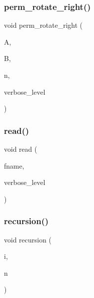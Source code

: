 \mbox{\label{costas_8_c_ab3d168af63cc369fc396300382735b31}} 
\subsubsection{\texorpdfstring{perm\+\_\+rotate\+\_\+right()}{perm\_rotate\_right()}}
{\footnotesize\ttfamily void perm\+\_\+rotate\+\_\+right (\begin{DoxyParamCaption}\item[{\mbox{\hyperlink{galois_8h_a09fddde158a3a20bd2dcadb609de11dc}{I\+NT}} $\ast$}]{A,  }\item[{\mbox{\hyperlink{galois_8h_a09fddde158a3a20bd2dcadb609de11dc}{I\+NT}} $\ast$}]{B,  }\item[{\mbox{\hyperlink{galois_8h_a09fddde158a3a20bd2dcadb609de11dc}{I\+NT}}}]{n,  }\item[{\mbox{\hyperlink{galois_8h_a09fddde158a3a20bd2dcadb609de11dc}{I\+NT}}}]{verbose\+\_\+level }\end{DoxyParamCaption})}

\mbox{\label{costas_8_c_acc0ad4ae49a21a58400e5082ae6bbff3}} 
\subsubsection{\texorpdfstring{read()}{read()}}
{\footnotesize\ttfamily void read (\begin{DoxyParamCaption}\item[{const \mbox{\hyperlink{galois_8h_ab6cc7b4aeb6ea31aba2b3fbfc83ff5e6}{B\+Y\+TE}} $\ast$}]{fname,  }\item[{\mbox{\hyperlink{galois_8h_a09fddde158a3a20bd2dcadb609de11dc}{I\+NT}}}]{verbose\+\_\+level }\end{DoxyParamCaption})}

\mbox{\label{costas_8_c_a9e6a01ce8b12a78ac13edd94a5c451a1}} 
\subsubsection{\texorpdfstring{recursion()}{recursion()}}
{\footnotesize\ttfamily void recursion (\begin{DoxyParamCaption}\item[{\mbox{\hyperlink{galois_8h_a09fddde158a3a20bd2dcadb609de11dc}{I\+NT}}}]{i,  }\item[{\mbox{\hyperlink{galois_8h_a09fddde158a3a20bd2dcadb609de11dc}{I\+NT}}}]{n }\end{DoxyParamCaption})}

